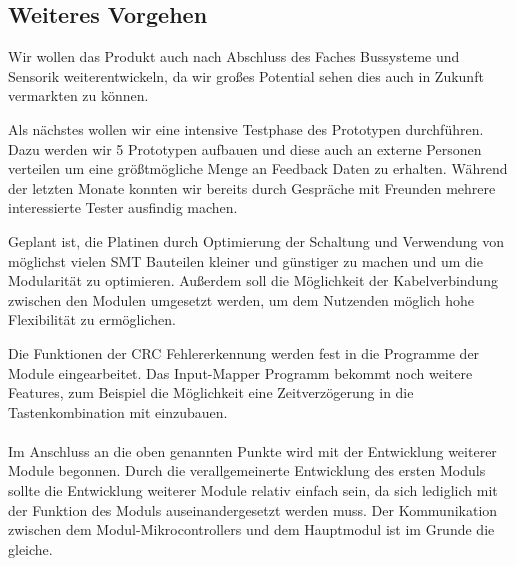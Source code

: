 \subsection{Weiteres Vorgehen}
Wir wollen das Produkt auch nach Abschluss des Faches \glqq Bussysteme und Sensorik\grqq{} weiterentwickeln, da wir großes Potential sehen dies auch in Zukunft vermarkten zu können.

Als nächstes wollen wir eine intensive Testphase des Prototypen durchführen. Dazu werden wir 5 Prototypen aufbauen und diese auch an externe Personen verteilen um eine größtmögliche Menge an Feedback Daten zu erhalten.
Während der letzten Monate konnten wir bereits durch Gespräche mit Freunden mehrere interessierte Tester ausfindig machen.

\newline 
Geplant ist, die Platinen durch Optimierung der Schaltung und Verwendung von möglichst vielen SMT Bauteilen kleiner und günstiger zu machen und um die Modularität zu optimieren. Außerdem soll die Möglichkeit der Kabelverbindung zwischen den Modulen umgesetzt werden, um dem Nutzenden möglich hohe Flexibilität zu ermöglichen. \newline 

Die Funktionen der CRC Fehlererkennung werden fest in die Programme der Module eingearbeitet. Das Input-Mapper Programm bekommt noch weitere Features, zum Beispiel die Möglichkeit eine Zeitverzögerung in die Tastenkombination mit einzubauen.
\\\\
Im Anschluss an die oben genannten Punkte wird mit der Entwicklung weiterer Module begonnen. Durch die verallgemeinerte Entwicklung des ersten Moduls sollte die Entwicklung weiterer Module relativ einfach sein, da sich lediglich mit der Funktion des Moduls auseinandergesetzt werden muss. Der Kommunikation zwischen dem Modul-Mikrocontrollers und dem Hauptmodul ist im Grunde die gleiche.
